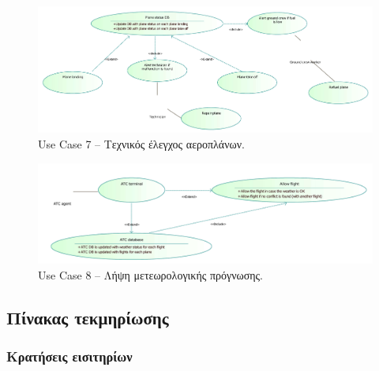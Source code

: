 \documentclass[12pt]{article}
\begin{document}
\begin{figure}[H]
	\centering
	\includegraphics[width=\linewidth]{./res/uc7.pdf}
	\caption{Use Case 7 -- Τεχνικός έλεγχος αεροπλάνων.}
\end{figure}

\begin{figure}[H]
	\centering
	\includegraphics[width=\linewidth]{./res/uc8.pdf}
	\caption{Use Case 8 -- Λήψη μετεωρολογικής πρόγνωσης.}
\end{figure}

\pagebreak
\subsection{Πίνακας τεκμηρίωσης}

\subsubsection{Κρατήσεις εισιτηρίων}
\end{document}
